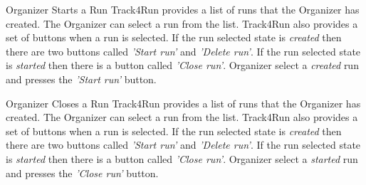 \documentclass[a4paper]{article}
\begin{document}
        \begin{usecase}{Organizer Starts a Run}
              {Track4Run provides a list of runs that the Organizer has created. The Organizer can select a run from the list. Track4Run also provides a set of buttons when a run is selected. If the run selected state is \textit{created} then there are two buttons called \textit{'Start run'} and \textit{'Delete run'}. If the run selected state is \textit{started} then there is a button called \textit{'Close run'}.}
              {Organizer select a \textit{created} run and presses the \textit{'Start run'} button.}
        \end{usecase}
        
        \begin{usecase}{Organizer Closes a Run}
              {Track4Run provides a list of runs that the Organizer has created. The Organizer can select a run from the list. Track4Run also provides a set of buttons when a run is selected. If the run selected state is \textit{created} then there are two buttons called \textit{'Start run'} and \textit{'Delete run'}. If the run selected state is \textit{started} then there is a button called \textit{'Close run'}.}
              {Organizer select a \textit{started} run and presses the \textit{'Close run'} button.}
        \end{usecase}
        
\end{document}
